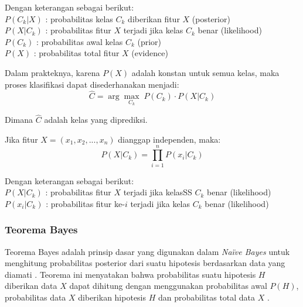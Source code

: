 \vspace{0.5em}

\noindent
Dengan keterangan sebagai berikut:\\[0.5em]
\hspace*{1.5em}$P(C_k|X)$ : probabilitas kelas $C_k$ diberikan fitur $X$ (posterior)\\
\hspace*{1.5em}$P(X|C_k)$ : probabilitas fitur $X$ terjadi jika kelas $C_k$ benar (likelihood)\\
\hspace*{1.5em}$P(C_k)$ \hspace{0.65em}: probabilitas awal kelas $C_k$ (prior)\\
\hspace*{1.5em}$P(X)$ \hspace{0.65em}: probabilitas total fitur $X$ (evidence)	

Dalam prakteknya, karena $P(X)$ adalah konstan untuk semua kelas, maka proses klasifikasi dapat disederhanakan menjadi:
\begin{equation}
	\hat{C} = \arg\max_{C_k} \; P(C_k) \cdot P(X|C_k)
\end{equation}	

\noindent
Dimana $\hat{C}$ adalah kelas yang diprediksi.

Jika fitur $X = (x_1, x_2, ..., x_n)$ dianggap independen, maka:
\begin{equation}
	P(X|C_k) = \prod_{i=1}^{n} P(x_i | C_k)
\end{equation}

\noindent
Dengan keterangan sebagai berikut:\\[0.5em]
\hspace*{1.5em}$P(X|C_k)$ : probabilitas fitur $X$ terjadi jika kelasSS $C_k$ benar (likelihood)\\
\hspace*{1.5em}$P(x_i|C_k)$ : probabilitas fitur ke-$i$ terjadi jika kelas $C_k$ benar (likelihood)\\


\subsubsection{Teorema Bayes}\label{II.Teorema Bayes}
Teorema Bayes adalah prinsip dasar yang digunakan dalam \textit{Naïve Bayes} untuk menghitung probabilitas posterior dari suatu hipotesis berdasarkan data yang diamati \cite{watratan2020implementasi}. Teorema ini menyatakan bahwa probabilitas suatu hipotesis $H$ diberikan data $X$ dapat dihitung dengan menggunakan probabilitas awal $P(H)$, probabilitas data $X$ diberikan hipotesis $H$ dan probabilitas total data $X$ \cite{Muhamad2017OptimasiNB}.

